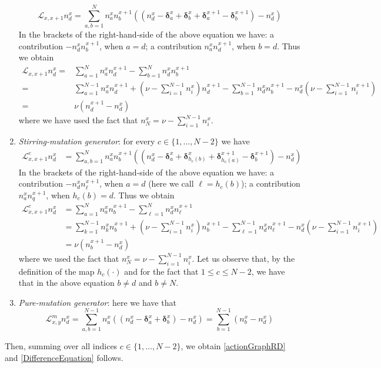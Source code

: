 \documentclass[10pt]{article}
\numberwithin{equation}{section}
\numberwithin{equation}{subsection}
\begin{document}
\begin{enumerate}
\begin{equation}
	\mathcal{L}_{x,x+1}n_{d}^{x}=\sum_{a,b=1}^{N}n_{a}^{x}n_{b}^{x+1}\left((n_{d}^{x}-\bm{\delta}_{a}^{x}+\bm{\delta}_{b}^{x}+\bm{\delta}_{a}^{x+1}-\bm{\delta}_{b}^{x+1})-n_{d}^{x}\right)
\end{equation}
In the brackets of the right-hand-side of the above equation we have: a contribution $-n_{d}^{x}n_{b}^{x+1}$, when $a=d$; a contribution $n_{a}^{x}n_{d}^{x+1}$, when $b=d$. Thus we obtain 
\begin{align*}
	\mathcal{L}_{x,x+1}n_{d}^{x}=&\sum_{a=1}^{N}n_{a}^{x}n_{d}^{x+1}-\sum_{b=1}^{N}n_{d}^{x}n_{b}^{x+1}\\
	=&\sum_{a=1}^{N-1}n_{a}^{x}n_{d}^{x+1}+(\nu-\sum_{i=1}^{N-1}n_{i}^{x})n_{d}^{x+1}-\sum_{b=1}^{N-1}n_{d}^{x}n_{b}^{x+1}-n_{d}^{x}(\nu-\sum_{i=1}^{N-1}n_{i}^{x+1})\\
	=&\nu\left(n_{d}^{x+1}-n_{d}^{x}\right)
\end{align*} 
where we have used the fact that $n_{N}^{x}=\nu-\sum_{i=1}^{N-1}n_{i}^{x}$.
\item \textit{Stirring-mutation generator}: for every $c\in \{1,\ldots,N-2\}$ we have 
\begin{equation}
	\begin{split}
		\mathcal{L}_{x,x+1}^{c}n_{d}^{x}&=\sum_{a,b=1}^{N}n_{a}^{x}n_{b}^{x+1}\left((n_{d}^{x}-\bm{\delta}_{a}^{x}+\bm{\delta}_{h_{c}(b)}^{x}+\bm{\delta}_{h_{c}(a)}^{x+1}-\bm{\delta}_{b}^{x+1})-n_{d}^{x}\right)
	\end{split}
\end{equation}
In the brackets of the right-hand-side of the above equation we have: a contribution $-n_{d}^{x}n_{\ell}^{x+1}$, when $a=d$ (here we call $\ell=h_{c}(b)$); a contribution $n_{a}^{x}n_{q}^{x+1}$, when $h_{c}(b)=d$. Thus we obtain 
\begin{align}
		\mathcal{L}_{x,x+1}^{c}n_{d}^{x}&=\sum_{a=1}^{N}n_{a}^{x}n_{b}^{x+1}-\sum_{\ell=1}^{N}n_{d}^{x}n_{\ell}^{x+1}
		\\&=
		\sum_{k=1}^{N-1}n_{k}^{x}n_{b}^{x+1}+\left(\nu-\sum_{i=1}^{N-1}n_{i}^{x}\right)n_{b}^{x+1}-\sum_{\ell=1}^{N-1}n_{d}^{x}n_{\ell}^{x+1}-n_{d}^{x}\left(\nu-\sum_{i=1}^{N-1}n_{i}^{x+1}\right)
		\\&=
		\nu(n_{b}^{x+1}-n_{d}^{x})
\end{align}
where  we used the fact that $n_{N}^{x}=\nu-\sum_{i=1}^{N-1}n_{i}^{x}$. Let us observe that, by the definition of the map $h_{c}(\cdot)$ and for the fact that $1\leq c\leq N-2$, we have that in the above equation $b\neq d$ and $b\neq N$.
\item \textit{Pure-mutation generator}: here we have that 
\begin{equation}
	\mathcal{L}_{x,y}^{m}n_{d}^{x}=\sum_{a,b=1}^{N-1}n_{a}^{x}\left((n_{d}^{x}-\bm{\delta}_{a}^{x}+\bm{\delta}_{b}^{x})-n_{d}^{x}\right)=\sum_{b=1}^{N-1}(n_{b}^{x}-n_{d}^{x})
\end{equation}
\end{enumerate}
Then, summing over all indices $c\in\{1,\ldots,N-2\}$, we obtain \eqref{actionGraphRD} and \eqref{DifferenceEquation} follows.
\end{document}
